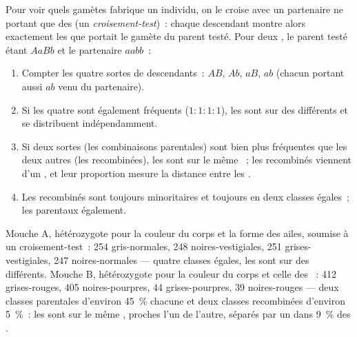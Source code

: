 \begin{method}\label{met:g12:meiosis-genetic-shuffling:testcross}
Pour voir quels gamètes fabrique un individu, on le croise avec un
partenaire ne portant que des   (un
\emph{croisement-test})~: chaque descendant montre alors exactement les
 que portait le gamète du parent testé. Pour deux , le
parent testé étant $AaBb$ et le partenaire $aabb$~:
\begin{enumerate}
  \item Compter les quatre sortes de descendants~: $AB$, $Ab$, $aB$,
        $ab$ (chacun portant aussi $ab$ venu du partenaire).
  \item Si les quatre sont également fréquents ($1:1:1:1$), les 
        sont sur des  différents et se distribuent
        indépendamment.
  \item Si deux sortes (les combinaisons parentales) sont bien plus
        fréquentes que les deux autres (les recombinées), les  sont
        sur le même ~; les recombinés viennent d'un
        , et leur proportion mesure la distance entre les
        .
  \item Les recombinés sont toujours minoritaires et toujours en deux
        classes égales~; les parentaux également.
\end{enumerate}
\end{method}

\begin{example}\label{ex:g12:meiosis-genetic-shuffling:fly}
Mouche A, hétérozygote pour la couleur du corps et la forme des ailes,
soumise à un croisement-test~: 254 gris-normales, 248
noires-vestigiales, 251 grises-vestigiales, 247 noires-normales ---
quatre classes égales, les  sont sur des  différents.
Mouche B, hétérozygote pour la couleur du corps et celle des ~: 412
grises-rouges, 405 noires-pourpres, 44 grises-pourpres, 39
noires-rouges --- deux classes parentales d'environ 45~\% chacune et
deux classes recombinées d'environ 5~\%~: les  sont sur le même
, proches l'un de l'autre, séparés par un  dans
9~\% des .
\end{example}

